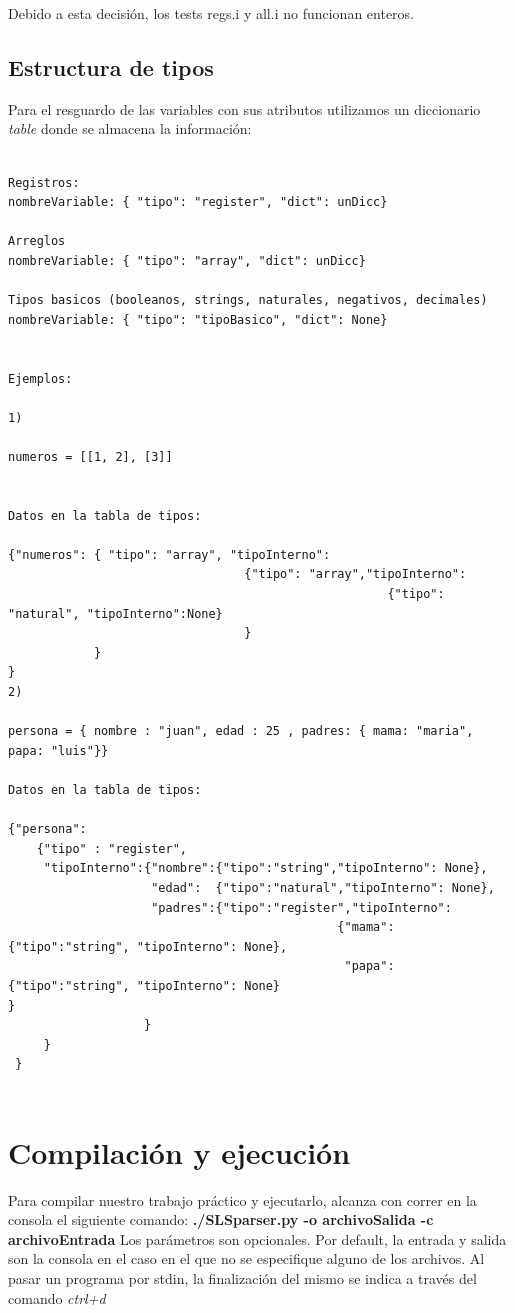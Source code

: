 \documentclass[10pt,a4paper]{article}
\begin{document}
 
Debido a esta decisión, los tests regs.i y all.i no funcionan enteros. 


\subsection{Estructura de tipos}

Para el resguardo de las variables con sus atributos utilizamos un diccionario \textit{table} donde se almacena la información: 

\begin{verbatim}

Registros:
nombreVariable: { "tipo": "register", "dict": unDicc}

Arreglos
nombreVariable: { "tipo": "array", "dict": unDicc}

Tipos basicos (booleanos, strings, naturales, negativos, decimales)
nombreVariable: { "tipo": "tipoBasico", "dict": None}


Ejemplos: 

1)

numeros = [[1, 2], [3]]


Datos en la tabla de tipos:

{"numeros": { "tipo": "array", "tipoInterno": 
							     {"tipo": "array","tipoInterno":
												     {"tipo": "natural", "tipoInterno":None}
								 }
			}
}
2)

persona = { nombre : "juan", edad : 25 , padres: { mama: "maria", papa: "luis"}}

Datos en la tabla de tipos:

{"persona": 
	{"tipo" : "register",
  	 "tipoInterno":{"nombre":{"tipo":"string","tipoInterno": None},
                  	"edad":  {"tipo":"natural","tipoInterno": None},
                  	"padres":{"tipo":"register","tipoInterno":
                                              {"mama": {"tipo":"string", "tipoInterno": None},
                                               "papa": {"tipo":"string", "tipoInterno": None}  												  }
                   }
     }
 }


\end{verbatim}
\section{Compilación y ejecución}
Para compilar nuestro trabajo práctico y ejecutarlo, alcanza con correr en la consola el siguiente comando:
\textbf{./SLSparser.py -o archivoSalida -c archivoEntrada} 
Los parámetros son opcionales. Por default, la entrada y salida son la consola en el caso en el que no se especifique alguno de los archivos.
Al pasar un programa por stdin, la finalización del mismo se indica a través del comando \textit{ctrl+d}
\end{document}

